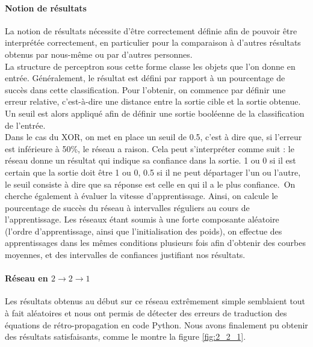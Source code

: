 \paragraph{Notion de résultats} %
\label{par:notion_de_resultats}
La notion de résultats nécessite d'être correctement définie afin de pouvoir être interprétée correctement, en particulier pour la comparaison à d'autres résultats obtenus par nous-même ou par d'autres personnes. \\
La structure de perceptron sous cette forme classe les objets que l'on donne en entrée. Généralement, le résultat est défini par rapport à un pourcentage de succès dans cette classification. Pour l'obtenir, on commence par définir une erreur relative, c'est-à-dire une distance entre la sortie cible et la sortie obtenue. Un seuil est alors appliqué afin de définir une sortie booléenne de la classification de l'entrée.\\
Dans le cas du XOR, on met en place un seuil de 0.5, c'est à dire que, si l'erreur est inférieure à 50\%, le réseau a raison. Cela peut s’interpréter comme suit : le réseau donne un résultat qui indique sa confiance dans la sortie. 1 ou 0 si il est certain que la sortie doit être 1 ou 0, 0.5 si il ne peut départager l'un ou l'autre, le seuil consiste à dire que sa réponse est celle en qui il a le plus confiance.\
On cherche également à évaluer la vitesse d'apprentissage. Ainsi, on calcule le pourcentage de succès du réseau à intervalles réguliers au cours de l'apprentissage. Les réseaux étant soumis à une forte composante aléatoire (l'ordre d'apprentissage, ainsi que l'initialisation des poids), on effectue des apprentissages dans les mêmes conditions plusieurs fois afin d'obtenir des courbes moyennes, et des intervalles de confiances justifiant nos résultats.

\paragraph{Réseau en $2\rightarrow2\rightarrow1$} %

Les résultats obtenus au début sur ce réseau extrêmement simple semblaient tout à fait aléatoires et nous ont permis de détecter des erreurs de traduction des équations de rétro-propagation en code Python. Nous avons finalement pu obtenir des résultats satisfaisants, comme le montre la figure \ref{fig:2_2_1}. 

